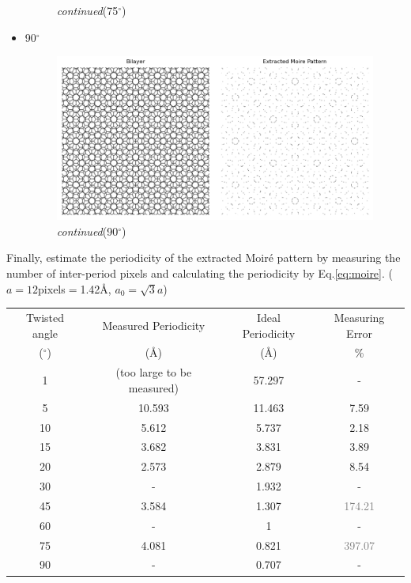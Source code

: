 \documentclass[12pt,a4paper]{article}
\begin{document}
\begin{CJK}{UTF8}{bkai}
\begin{itemize}
\begin{figure}[h]
        \vspace{-0.5cm}
        \caption{\textit{continued}(75$^\circ$)}
        \label{fig:moire_75_extract}
    \end{figure}
    \clearpage
    \item 90$^\circ$
    \begin{figure}[h]
        \centering
        \vspace{-0.5cm}
        \includegraphics[width=0.65\linewidth]{figures/90degree_moire.png}
        \vspace{-0.5cm}
        \caption{\textit{continued}(90$^\circ$)}
        \label{fig:moire_90_extract}
    \end{figure}
    \end{itemize}
Finally, estimate the periodicity of the extracted Moiré pattern by measuring the number of inter-period pixels and calculating the periodicity by Eq.\ref{eq:moire}. ($a=12$pixels$=$1.42\AA, $a_0=\sqrt{3}a$)
\begin{center}
\begin{tabular}{c|c|c|c}
Twisted angle   &   Measured Periodicity &   Ideal Periodicity   &   Measuring Error\\
($^\circ$)        &              (\AA)     &   (\AA)  &   \%\\
\hline
\hline
1   &   (too large to be measured)       &   57.297  &   -   \\
5   &   10.593  &   11.463  &   7.59\\
10  &   5.612   &   5.737   &   2.18\\
15  &   3.682   &   3.831   &   3.89\\
20  &   2.573   &   2.879   &   8.54\\
30  &   -       &   1.932   &   -   \\
45  &   3.584   &   1.307   &   \textcolor{Gray}{174.21}\\
60  &   -       &   1       &   -   \\
75  &   4.081   &   0.821   &   \textcolor{Gray}{397.07}\\
90  &   -       &   0.707   &   -   
\end{tabular}
\end{center}


\end{CJK}
\end{document}
